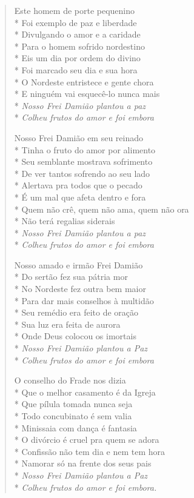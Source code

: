 \begin{verse}
Este homem de porte pequenino\\*
Foi exemplo de paz e liberdade\\*
Divulgando o amor e a caridade\\*
Para o homem sofrido nordestino\\*
Eis um dia por ordem do divino\\*
Foi marcado seu dia e sua hora\\*
O Nordeste entristece e gente chora\\*
E ninguém vai esquecê-lo nunca mais\\*
\textit{Nosso Frei Damião plantou a paz}\\*
\textit{Colheu frutos do amor e foi embora}

Nosso Frei Damião em seu reinado\\*
Tinha o fruto do amor por alimento\\*
Seu semblante mostrava sofrimento\\*
De ver tantos sofrendo ao seu lado\\*
Alertava pra todos que o pecado\\*
É um mal que afeta dentro e fora\\*
Quem não crê, quem não ama, quem não ora\\*
Não terá regalias siderais\\*
\textit{Nosso Frei Damião plantou a paz}\\*
\textit{Colheu frutos do amor e foi embora}

Nosso amado e irmão Frei Damião\\*
Do sertão fez sua pátria mor\\*
No Nordeste fez outra bem maior\\*
Para dar mais conselhos à multidão\\*
Seu remédio era feito de oração\\*
Sua luz era feita de aurora\\*
Onde Deus colocou os imortais\\*
\textit{Nosso Frei Damião plantou a Paz}\\*
\textit{Colheu frutos do amor e foi embora}

O conselho do Frade nos dizia\\*
Que o melhor casamento é da Igreja\\*
Que pílula tomada nunca seja\\*
Todo concubinato é sem valia\\*
Minissaia com dança é fantasia\\*
O divórcio é cruel pra quem se adora\\*
Confissão não tem dia e nem tem hora\\*
Namorar só na frente dos seus pais\\*
\textit{Nosso Frei Damião plantou a Paz}\\*
\textit{Colheu frutos do amor e foi embora.}


\end{verse}
